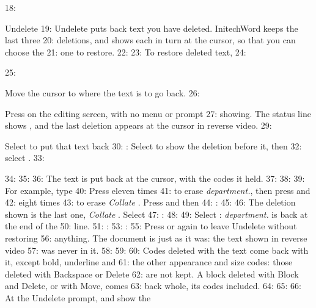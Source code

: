 18: \begin{Feature}{Undelete}
19: Undelete puts back text you have deleted.  InitechWord keeps the last three
20: deletions, and shows each in turn at the cursor, so that you can choose the
21: one to restore.
22: 
23: To restore deleted text,
24: \begin{WPSteps}
25: \item Move the cursor to where the text is to go back.
26: \item Press  on the editing screen, with no menu or prompt
27: showing.  The status line shows , and the last deletion appears at the cursor in reverse video.
29: \item Select  to put that text back
30: : Select  to show the deletion before it, then
32: select .
33: \end{WPSteps}
34: 
35: 
36: The text is put back at the cursor, with the codes it held.
37: 
38: 
39: For example, type 
40: Press  eleven times
41: to erase \textit{department.}, then press  and
42:  eight times
43: to erase \textit{Collate }.  Press  and then
44: :
45: 
46: The deletion shown is the last one, \textit{Collate }.  Select
47: :
48: 
49: Select : \textit{department.} is back at the end of the
50: line.
51: : 
53: : 
55: Press  or  again to leave Undelete without restoring
56: anything.  The document is just as it was: the text shown in reverse video
57: was never in it.
58: 
59: 
60: Codes deleted with the text come back with it, except bold, underline and
61: the other appearance and size codes: those deleted with Backspace or Delete
62: are not kept.  A block deleted with Block and Delete, or with Move, comes
63: back whole, its codes included.
64: 
65: 
66: At the Undelete prompt,  and  show the

\end{Feature}
